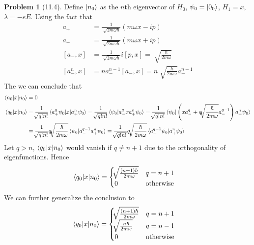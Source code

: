 \documentclass[twoside,11pt]{article}
\theoremstyle{definition}
\newtheorem{problem}{Problem}
\theoremstyle{remark}
\begin{document}
\begin{problem}[11.4]
Define $\ket{n_0}$ as the $n$th eigenvector of $H_0$, $\psi_0=\ket{0_0}$,
$H_1=x$, $\lambda=-eE$.
Using the fact that
\begin{align*}
    a_+ & = \frac{1}{\sqrt[]{2m\omega\hbar}}(m\omega x - ip)\\
    a_- & = \frac{1}{\sqrt[]{2m\omega\hbar}}(m\omega x + ip)\\
    [a_-, x] &= \frac{1}{\sqrt[]{2m\omega\hbar}}i[p,x] = \sqrt[]{\frac{\hbar}{2m\omega}}\\
    [a_-^n, x] &= na_-^{n-1}[a_-, x] = n\sqrt[]{\frac{\hbar}{2m\omega}}a_-^{n-1}
\end{align*}
The we can conclude that
\begin{align*}
    \braket{n_0|x|n_0} &= 0 \\
    \braket{q_0|x|n_0} &= \frac{1}{\sqrt[]{q! n!}}\braket{a_+^q\psi_0|x|a_+^n\psi_0} 
    = \frac{1}{\sqrt[]{q! n!}}\braket{\psi_0|a_-^qxa_+^n\psi_0}
    = \frac{1}{\sqrt[]{q! n!}}\braket{\psi_0|\left(xa_-^q+ q\sqrt[]{\frac{\hbar}{2m\omega}}a_-^{q-1}\right)a_+^n\psi_0}\\
    &= \frac{1}{\sqrt[]{q! n!}}q\sqrt[]{\frac{\hbar}{2m\omega}}\braket{\psi_0|a_-^{q-1} a_+^n\psi_0}
    = \frac{1}{\sqrt[]{q! n!}}q\sqrt[]{\frac{\hbar}{2m\omega}}\braket{a_+^{q-1}\psi_0| a_+^n\psi_0}
\end{align*}
Let $q>n$, $\braket{q_0|x|n_0}$ would vanish if $q\neq n+1$ due to the
orthogonality of eigenfunctions. Hence
\begin{align*}
    \braket{q_0|x|n_0} &=\begin{cases}
        \sqrt[]{\frac{(n+1)\hbar}{2m\omega}} & q = n+1\\
        0 & \text{otherwise}
    \end{cases}
\end{align*}
We can further generalize the conclusion to
\begin{align*}
    \braket{q_0|x|n_0} &=\begin{cases}
        \sqrt[]{\frac{(n+1)\hbar}{2m\omega}} & q = n+1\\
        \sqrt[]{\frac{n\hbar}{2m\omega}} & q = n-1\\
        0 & \text{otherwise}
    \end{cases}
\end{align*}


\end{problem}
\end{document}
